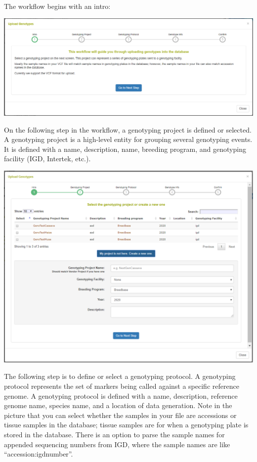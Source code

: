 \documentclass[
  12pt,
]{book}
\begin{document}
The workflow begins with an intro:

\begin{center}\includegraphics[width=0.95\linewidth]{assets/images/manage_genotyping_data_upload_dialog_intro} \end{center}

On the following step in the workflow, a genotyping project is defined or selected. A genotyping project is a high-level entity for grouping several genotyping events. It is defined with a name, description, name, breeding program, and genotyping facility (IGD, Intertek, etc.).

\begin{center}\includegraphics[width=0.95\linewidth]{assets/images/manage_genotyping_data_upload_dialog_project} \end{center}

The following step is to define or select a genotyping protocol. A genotyping protocol represents the set of markers being called against a specific reference genome. A genotyping protocol is defined with a name, description, reference genome name, species name, and a location of data generation. Note in the picture that you can select whether the samples in your file are accessions or tissue samples in the database; tissue samples are for when a genotyping plate is stored in the database. There is an option to parse the sample names for appended sequencing numbers from IGD, where the sample names are like ``accession:igdnumber''.
\end{document}
